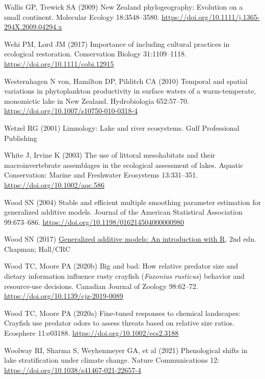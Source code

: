 \documentclass[
  12pt,
  a4paper,
]{scrbook}
\newlength{\cslhangindent}
\newenvironment{CSLReferences}[2] %
 {\begin{list}{}{%
  \setlength{\itemindent}{0pt}
  \setlength{\leftmargin}{0pt}
  \setlength{\parsep}{0pt}
  \ifodd #1
   \setlength{\leftmargin}{\cslhangindent}
   \setlength{\itemindent}{-1\cslhangindent}
  \fi
  \setlength{\itemsep}{#2\baselineskip}}}
 {\end{list}}
\begin{document}
\begin{CSLReferences}{1}{1}
Wallis GP, Trewick SA (2009) {New Zealand} phylogeography: Evolution on
a small continent. Molecular Ecology 18:3548--3580.
\url{https://doi.org/10.1111/j.1365-294X.2009.04294.x}

Wehi PM, Lord JM (2017) Importance of including cultural practices in
ecological restoration. Conservation Biology 31:1109--1118.
\url{https://doi.org/10.1111/cobi.12915}

Westernhagen N von, Hamilton DP, Pilditch CA (2010) Temporal and spatial
variations in phytoplankton productivity in surface waters of a
warm-temperate, monomictic lake in {New Zealand}. Hydrobiologia
652:57--70. \url{https://doi.org/10.1007/s10750-010-0318-4}

Wetzel RG (2001) Limnology: Lake and river ecosystems. Gulf Professional
Publishing

White J, Irvine K (2003) The use of littoral mesohabitats and their
macroinvertebrate assemblages in the ecological assessment of lakes.
Aquatic Conservation: Marine and Freshwater Ecosystems 13:331--351.
\url{https://doi.org/10.1002/aqc.586}

Wood SN (2004) Stable and efficient multiple smoothing parameter
estimation for generalized additive models. Journal of the American
Statistical Association 99:673--686.
\url{https://doi.org/10.1198/016214504000000980}

Wood SN (2017) \href{https://doi.org/10.1201/9781315370279}{Generalized
additive models: An introduction with {R}}, 2nd edn. Chapman; Hall/CRC

Wood TC, Moore PA (2020b) Big and bad: How relative predator size and
dietary information influence rusty crayfish ({\emph{Faxonius
rusticus}}) behavior and resource-use decisions. Canadian Journal of
Zoology 98:62--72. \url{https://doi.org/10.1139/cjz-2019-0089}

Wood TC, Moore PA (2020a) Fine-tuned responses to chemical landscapes:
Crayfish use predator odors to assess threats based on relative size
ratios. Ecosphere 11:e03188. \url{https://doi.org/10.1002/ecs2.3188}

Woolway RI, Sharma S, Weyhenmeyer GA, et al (2021) Phenological shifts
in lake stratification under climate change. Nature Communications 12:
\url{https://doi.org/10.1038/s41467-021-22657-4}


\end{CSLReferences}
\end{document}
